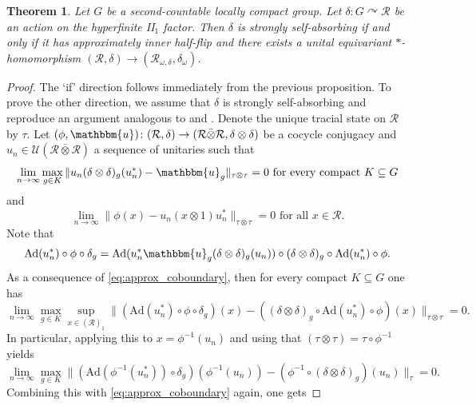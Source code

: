 \documentclass[11pt,a4paper]{article}
\newtheorem{theorem}{Theorem}
\theoremstyle{definition}
\theoremstyle{remark}
\numberwithin{equation}{section}
\numberwithin{theorem}{section}
\newcommand{\acts}{\curvearrowright}
\begin{document}
\begin{theorem} \label{theorem:equivalence_ssa}
Let $G$ be a second-countable locally compact group.
Let $\delta:G \acts \mathcal{R}$ be an action on the hyperfinite II$_1$ factor.
Then $\delta$ is strongly self-absorbing if and only if it has approximately inner half-flip and there exists a unital equivariant $*$-homomorphism $(\mathcal{R}, \delta) \rightarrow (\mathcal{R}_{\omega,\delta}, \delta_\omega)$. 
\end{theorem}
\begin{proof}
The `if' direction follows immediately from the previous proposition.
To prove the other direction, we assume that $\delta$ is strongly self-absorbing and reproduce an argument analogous to \cite[Proposition 1.4]{TomsWinter07} and \cite[Proposition 5.5]{Szabo21cc}.
Denote the unique tracial state on $\mathcal{R}$ by $\tau$. Let $(\phi,\mathbbm{u})\colon (\mathcal{R}, \delta) \rightarrow (\mathcal{R} \bar{\otimes} \mathcal{R}, \delta \otimes \delta)$ be a cocycle conjugacy and $u_n \in \mathcal{U}(\mathcal{R} \bar{\otimes} \mathcal{R})$ a sequence of unitaries such that
\begin{equation}\label{eq:approx_coboundary}
\lim_{n \rightarrow \infty} \max_{g \in K} \| u_n(\delta \otimes \delta)_g(u_n^*) - \mathbbm{u}_g\|_{\tau \otimes \tau} = 0 \text{ for every compact } K \subseteq G
\end{equation} 
and
\[
\lim_{n \rightarrow \infty} \|\phi(x) - u_n(x \otimes 1) u_n^*\|_{\tau \otimes \tau} = 0 \text{ for all } x \in \mathcal{R}.
\]
%
Note that 
\[\mathrm{Ad}(u_n^*) \circ \phi \circ \delta_g = \mathrm{Ad}(u_n^*\mathbbm{u}_g (\delta \otimes \delta)_g(u_n)) \circ (\delta \otimes \delta)_g \circ \mathrm{Ad}(u_n^*) \circ \phi.\]
As a consequence of \eqref{eq:approx_coboundary}, then for every compact $K \subseteq G$ one has 
\begin{equation}\label{eq:approximate_invariance_perturbation}\lim_{n \rightarrow \infty} \max_{g \in K} \sup_{x \in (\mathcal{R})_1} \|(\mathrm{Ad}(u_n^*) \circ \phi \circ \delta_g)(x) - ((\delta \otimes \delta)_g \circ \mathrm{Ad}(u_n^*) \circ \phi)(x)\|_{\tau \otimes \tau} = 0.\end{equation}
%
In particular, applying this to $x = \phi^{-1}(u_n)$ and using that $(\tau \otimes \tau) = \tau \circ \phi^{-1}$ yields
\[\lim_{n \rightarrow \infty} \max_{g \in K}\|(\mathrm{Ad}(\phi^{-1}(u_n^*)) \circ \delta_g) (\phi^{-1}(u_n)) -(\phi^{-1}\circ (\delta \otimes \delta)_g)(u_n)\|_\tau = 0.\]
Combining this with \eqref{eq:approx_coboundary} again, one gets

\end{proof}
\end{document}
